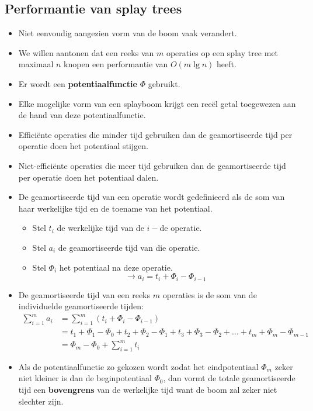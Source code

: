 \subsection{Performantie van splay trees}
\begin{itemize}
    \item Niet eenvoudig aangezien vorm van de boom vaak verandert.
    \item We willen aantonen dat een reeks van $m$ operaties op een splay tree met maximaal $n$ knopen een performantie van $O(m\lg n)$ heeft.
    \item Er wordt een \textbf{potentiaalfunctie} $\Phi$ gebruikt.
    \item Elke mogelijke vorm van een splayboom krijgt een reeël getal toegewezen aan de hand van deze potentiaalfunctie.
    \item Efficiënte operaties die minder tijd gebruiken dan de geamortiseerde tijd per operatie doen het potentiaal stijgen.
    \item Niet-efficiënte operaties die meer tijd gebruiken dan de geamortiseerde tijd per operatie doen het potentiaal dalen.
    \item De geamortiseerde tijd van een operatie wordt gedefinieerd als de som van haar werkelijke tijd en de toename van het potentiaal.
    \begin{itemize}
        \item Stel $t_i$ de werkelijke tijd van de $i-$de operatie.
        \item Stel $a_i$ de geamortiseerde tijd van die operatie.
        \item Stel $\Phi_i$ het potentiaal na deze operatie.
        $$\rightarrow a_i = t_i + \Phi_{i} - \Phi_{i - 1}$$
    \end{itemize}
    \item De geamortiseerde tijd van een reeks $m$ operaties is de som van de individuelde geamortiseerde tijden:
    \begin{equation*}
        \begin{split}
            \sum_{i=1}^m a_i &= \sum_{i=1}^m (t_i + \Phi_{i} - \Phi_{i - 1}) \\
                             &= t_1 + \Phi_1 - \Phi_0 + t_2 + \Phi_2 - \Phi_1 + t_3 + \Phi_3 - \Phi_2 + \dots + t_m + \Phi_m - \Phi_{m - 1} \\
                             &= \Phi_{m} - \Phi_{0} + \sum_{i=1}^m t_i
        \end{split}
    \end{equation*}
    \item Als de potentiaalfunctie zo gekozen wordt zodat het eindpotentiaal $\Phi_m$ zeker niet kleiner is dan de beginpotentiaal $\Phi_0$, dan vormt de totale geamortiseerde tijd een \textbf{bovengrens} van de werkelijke tijd want de boom zal zeker niet slechter zijn.

\end{itemize}
